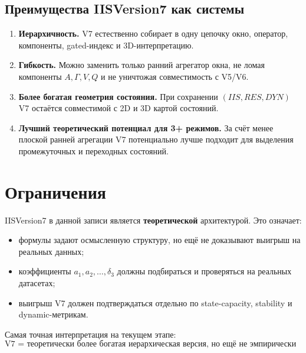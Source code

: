 \documentclass[12pt,a4paper]{article}
\begin{document}
\subsection{Преимущества IISVersion7 как системы}
\begin{enumerate}[leftmargin=1.25cm]
    \item \textbf{Иерархичность.} V7 естественно собирает в одну цепочку окно, оператор, компоненты, gated-индекс и 3D-интерпретацию.
    \item \textbf{Гибкость.} Можно заменить только ранний агрегатор окна, не ломая компоненты \(A,\Gamma,V,Q\) и не уничтожая совместимость с V5/V6.
    \item \textbf{Более богатая геометрия состояния.} При сохранении \((IIS,RES,DYN)\) V7 остаётся совместимой с 2D и 3D картой состояний.
    \item \textbf{Лучший теоретический потенциал для 3+ режимов.} За счёт менее плоской ранней агрегации V7 потенциально лучше подходит для выделения промежуточных и переходных состояний.
\end{enumerate}

\section{Ограничения}
IISVersion7 в данной записи является \textbf{теоретической} архитектурой.
Это означает:
\begin{itemize}[leftmargin=1.25cm]
    \item формулы задают осмысленную структуру, но ещё не доказывают выигрыш на реальных данных;
    \item коэффициенты \(a_1,a_2,\dots,\delta_3\) должны подбираться и проверяться на реальных датасетах;
    \item выигрыш V7 должен подтверждаться отдельно по state-capacity, stability и dynamic-метрикам.
\end{itemize}

Самая точная интерпретация на текущем этапе:
\[
\text{V7 = теоретически более богатая иерархическая версия, но ещё не эмпирически финальная.}
\]
\end{document}
